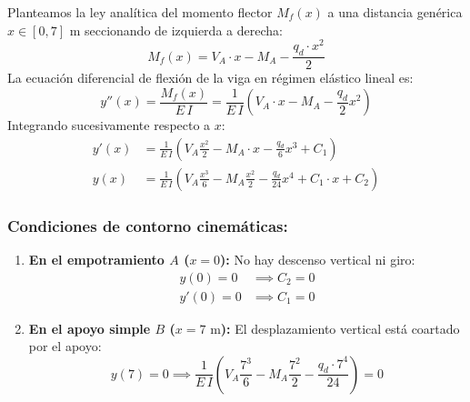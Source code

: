 
Planteamos la ley analítica del momento flector $M_f(x)$ a una distancia genérica $x \in [0, 7]\text{ m}$ seccionando de izquierda a derecha:
\begin{equation}
    M_f(x) = V_A \cdot x - M_A - \frac{q_d \cdot x^2}{2}
\end{equation}
La ecuación diferencial de flexión de la viga en régimen elástico lineal es:
\begin{equation}
    y''(x) = \frac{M_f(x)}{E\,I} = \frac{1}{E\,I}\left(V_A \cdot x - M_A - \frac{q_d}{2}x^2\right)
\end{equation}
Integrando sucesivamente respecto a $x$:
\begin{align}
    y'(x) & = \frac{1}{E\,I}\left(V_A \frac{x^2}{2} - M_A \cdot x - \frac{q_d}{6}x^3 + C_1\right) \\[6pt]
    y(x)  & = \frac{1}{E\,I}\left(V_A \frac{x^3}{6} - M_A \frac{x^2}{2} - \frac{q_d}{24}x^4 + C_1 \cdot x + C_2\right)
\end{align}

\subsubsection*{Condiciones de contorno cinemáticas:}
\begin{enumerate}
    \item \textbf{En el empotramiento $A$ ($x = 0$):} No hay descenso vertical ni giro:
          \begin{align}
              y(0) = 0   & \implies C_2 = 0 \\[4pt]
              y'(0) = 0  & \implies C_1 = 0
          \end{align}
    \item \textbf{En el apoyo simple $B$ ($x = 7\text{ m}$):} El desplazamiento vertical está coartado por el apoyo:
          \begin{equation}
              y(7) = 0 \implies \frac{1}{E\,I}\left(V_A \frac{7^3}{6} - M_A \frac{7^2}{2} - \frac{q_d \cdot 7^4}{24}\right) = 0
          \end{equation}
\end{enumerate}

